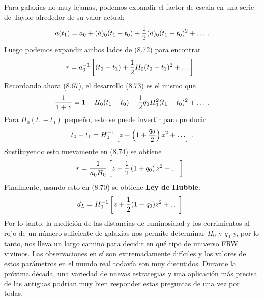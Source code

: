 \documentclass[11pt,b5paper,openany,twoside]{book}
\begin{document}
Para galaxias no muy lejanas, podemos expandir el factor de escala en una serie de Taylor alrededor de su valor actual:
\begin{equation}
a(t_1)=a_0 + (\dot a)_0(t_1-t_0) +{1\over 2}(\ddot a)_0
(t_1-t_0)^2 + \ldots \,.\label{8.73}
\end{equation}
Luego podemos expandir ambos lados de (8.72) para encontrar
\begin{equation}
r= a_0^{-1}\left[(t_0-t_1)+{1\over 2}H_0(t_0-t_1)^2 +\ldots
\right]\,.
\label{8.74}
\end{equation}
Recordando ahora (8.67), el desarrollo (8.73) es el mismo que
\begin{equation}
{1\over {1+z}} = 1+H_0(t_1-t_0) -{1\over 2}q_0 H_0^2
(t_1-t_0)^2 + \ldots \,.\label{8.75}
\end{equation}
Para $H_0(t_1-t_0)$ pequeño, esto se puede invertir para producir
\begin{equation}
t_0-t_1 = H_0^{-1}\left[z-\left(1+{{q_0}\over 2}\right)
z^2 + \ldots\right]\,.\label{8.76}
\end{equation}
Sustituyendo esto nuevamente en (8.74) se obtiene
\begin{equation}
r = {1\over{a_0 H_0}}\left[z-{1\over 2}\left(1+q_0\right)
z^2 + \ldots\right]\,.\label{8.77}
\end{equation}
Finalmente, usando esto en (8.70) se obtiene {\bf Ley de Hubble}:
\begin{equation}
d_L = H_0^{-1}\left[ z+{1\over 2}(1-q_0)z^2 + \ldots\right]\,.
\label{8.78}
\end{equation}
Por lo tanto, la medición de las distancias de luminosidad y los corrimientos al rojo de un número suficiente de galaxias nos permite determinar $H_0$ y $q_0$ y, por lo tanto, nos lleva un largo camino para decidir en qué tipo de universo FRW vivimos.
Las observaciones en sí son extremadamente difíciles y los valores de estos parámetros en el mundo real todavía son muy discutidos.
Durante la próxima década, una variedad de nuevas estrategias y una aplicación más precisa de las antiguas podrían muy bien responder estas preguntas de una vez por todas.


\end{document}
